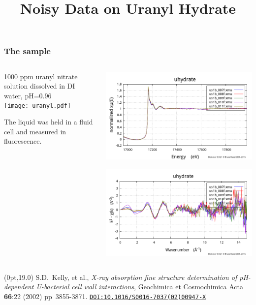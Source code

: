 \documentclass[10pt, xcolor=x11names, compress]{beamer}
\title{Noisy Data on Uranyl Hydrate}
\begin{document}
\maketitle


\begin{frame}
  \frametitle{The sample}
  \begin{columns}[T]
    \begin{column}{0.5\linewidth}
      1000 ppm uranyl nitrate solution dissolved in DI water, pH=0.96\\[3ex]

      \texttt{[image: uranyl.pdf]}

      \bigskip

      The liquid was held in a fluid cell and measured in fluorescence.
    \end{column}
    \begin{column}{0.5\linewidth}
      \includegraphics[width=\linewidth]{images/uhydrate_mu.png}

      \includegraphics[width=\linewidth]{images/uhydrate_chi.png}
    \end{column}
  \end{columns}

  \begin{textblock*}{0.7\linewidth}(0pt,19.0\TPVertModule)%
    \tiny%
    S.D.\ Kelly, et al., \textit{X-ray absorption fine structure
      determination of pH-dependent U-bacterial cell wall
      interactions}, Geochimica et Cosmochimica Acta \textbf{66}:22
    (2002) pp\  3855-3871.
    \href{http://dx.doi.org/10.1016/S0016-7037(02)00947-X}
    {\color{Blue4}\texttt{DOI:10.1016/S0016-7037(02)00947-X}}
  \end{textblock*}
\end{frame}
\end{document}

